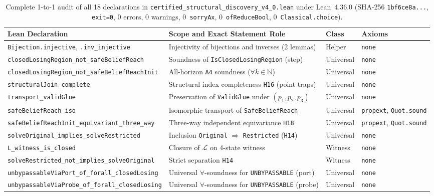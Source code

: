 \documentclass[10pt,a4paper]{article}
\newcommand{\code}[1]{\nolinkurl{#1}}
\begin{document}
\begin{table}[!htbp]
\centering
\caption{Complete 1-to-1 audit of all 18 declarations in \code{certified_structural_discovery_v4_0.lean} under Lean~4.36.0 (SHA-256 \code{1bf6ce8a...}, \code{exit=0}, 0 errors, 0 warnings, 0~\code{sorryAx}, 0~\code{ofReduceBool}, 0~\code{Classical.choice}).}
\label{tab:lean-audit}
\footnotesize
\renewcommand{\arraystretch}{1.12}
\begin{tabularx}{\linewidth}{@{}>{\raggedright\arraybackslash}p{6.5cm}>{\raggedright\arraybackslash}Xll@{}}
\toprule
\textbf{Lean Declaration} & \textbf{Scope and Exact Statement Role} & \textbf{Class} & \textbf{Axioms} \\
\midrule
\code{Bijection.injective}, \code{.inv_injective} & Injectivity of bijections and inverses (2 lemmas) & Helper & \code{none} \\
\code{closedLosingRegion_not_safeBeliefReach} & Soundness of \code{IsClosedLosingRegion} (step) & Universal & \code{none} \\
\code{closedLosingRegion_not_safeBeliefReachInit} & All-horizon \code{A4} soundness ($\forall k \in \mathbb{N}$) & Universal & \code{none} \\
\code{structuralJoin_complete} & Structural index completeness \code{H16} (point traps) & Universal & \code{none} \\
\code{transport_validGlue} & Preservation of \code{ValidGlue} under $(p_1, p_2, p_3)$ & Universal & \code{none} \\
\code{safeBeliefReach_iso} & Isomorphic transport of \code{SafeBeliefReach} & Universal & \texttt{propext}, \texttt{Quot.sound} \\
\code{safeBeliefReachInit_equivariant_three_way} & Three-way independent equivariance \code{H18} & Universal & \texttt{propext}, \texttt{Quot.sound} \\
\code{solveOriginal_implies_solveRestricted} & Inclusion \code{Original} $\Rightarrow$ \code{Restricted} (\code{H14}) & Universal & \code{none} \\
\code{L_witness_is_closed} & Closure of $\mathcal{L}$ on 4-state witness & Witness & \code{none} \\
\code{solveRestricted_not_implies_solveOriginal} & Strict separation \code{H14} & Witness & \code{none} \\
\code{unbypassableViaPort_of_forall_closedLosing} & Universal $\forall$-soundness for \code{UNBYPASSABLE} (port) & Universal & \code{none} \\
\code{unbypassableViaProbe_of_forall_closedLosing} & Universal $\forall$-soundness for \code{UNBYPASSABLE} (probe) & Universal & \code{none} \\

\end{tabularx}
\end{table}
\end{document}
